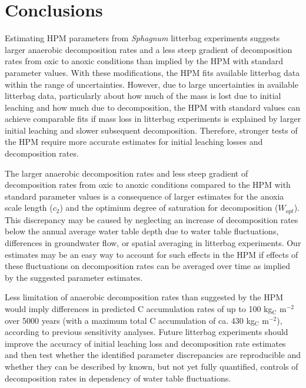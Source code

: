 \documentclass[
  12pt,
]{article}
\begin{document}
\hypertarget{conclusions}{%
\section{Conclusions}\label{conclusions}}

Estimating HPM parameters from \emph{Sphagnum} litterbag experiments suggests larger anaerobic decomposition rates and a less steep gradient of decomposition rates from oxic to anoxic conditions than implied by the HPM with standard parameter values. With these modifications, the HPM fits available litterbag data within the range of uncertainties. However, due to large uncertainties in available litterbag data, particularly about how much of the mass is lost due to initial leaching and how much due to decomposition, the HPM with standard values can achieve comparable fits if mass loss in litterbag experiments is explained by larger initial leaching and slower subsequent decomposition. Therefore, stronger tests of the HPM require more accurate estimates for initial leaching losses and decomposition rates.

The larger anaerobic decomposition rates and less steep gradient of decomposition rates from oxic to anoxic conditions compared to the HPM with standard parameter values is a consequence of larger estimates for the anoxia scale length (\(c_2\)) and the optimium degree of saturation for decomposition (\(W_{opt}\)). This discrepancy may be caused by neglecting an increase of decomposition rates below the annual average water table depth due to water table fluctuations, differences in groundwater flow, or spatial averaging in litterbag experiments. Our estimates may be an easy way to account for such effects in the HPM if effects of these fluctuations on decomposition rates can be averaged over time as implied by the suggested parameter estimates.

Less limitation of anaerobic decomposition rates than suggested by the HPM would imply differences in predicted C accumulation rates of up to 100 kg\(_\text{C}\) m\(^{-2}\) over 5000 years (with a maximum total C accumulation of ca. 430 kg\(_\text{C}\) m\(^{-2}\)), according to previous sensitivity analyses. Future litterbag experiments should improve the accuracy of initial leaching loss and decomposition rate estimates and then test whether the identified parameter discrepancies are reproducible and whether they can be described by known, but not yet fully quantified, controls of decomposition rates in dependency of water table fluctuations.
\end{document}
